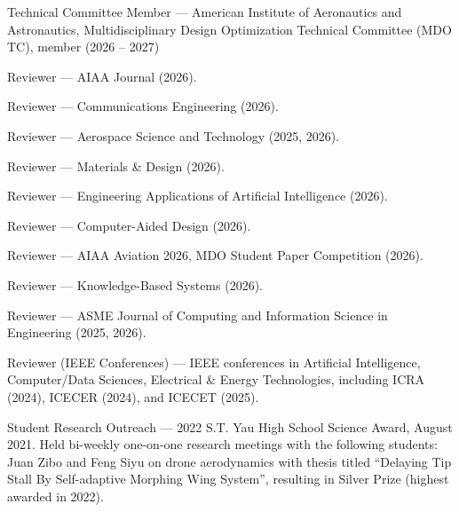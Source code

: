 \vspace{10pt}
\begin{cvitems}
\paragraphstyle
\item Technical Committee Member --- American Institute of Aeronautics and Astronautics, Multidisciplinary Design Optimization Technical Committee (MDO TC), member (2026 -- 2027)
\item Reviewer --- AIAA Journal (2026). %
\item Reviewer --- Communications Engineering (2026).%
\item Reviewer --- Aerospace Science and Technology (2025, 2026).%
\item Reviewer --- Materials \& Design (2026).%
\item Reviewer --- Engineering Applications of Artificial Intelligence (2026).%
\item Reviewer --- Computer-Aided Design (2026).%
\item Reviewer --- AIAA Aviation 2026, MDO Student Paper Competition (2026).%
\item Reviewer --- Knowledge-Based Systems (2026).%
\item Reviewer --- ASME Journal of Computing and Information Science in Engineering (2025, 2026).%
\item Reviewer (IEEE Conferences) --- IEEE conferences in Artificial Intelligence, Computer/Data Sciences, Electrical \& Energy Technologies, including ICRA (2024), ICECER (2024), and ICECET (2025).
\item Student Research Outreach --- 2022 S.T. Yau High School Science Award, August 2021. Held bi-weekly one-on-one research meetings with the following students: Juan Zibo and Feng Siyu on drone aerodynamics with thesis titled ``Delaying Tip Stall By Self-adaptive Morphing Wing System'', resulting in Silver Prize (highest awarded in 2022).
\end{cvitems}
\vspace{10pt}




